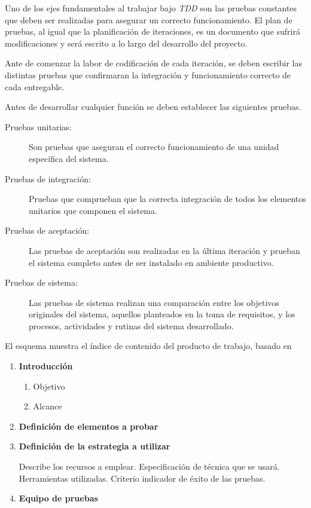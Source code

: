Uno de los ejes fundamentales al trabajar bajo \emph{TDD} son las pruebas constantes que deben ser realizadas para asegurar un correcto funcionamiento. El plan de pruebas, al igual que la planificación de iteraciones, es un documento que sufrirá modificaciones y será escrito a lo largo del desarrollo del proyecto.

Ante de comenzar la labor de codificación de cada iteración, se deben escribir las distintas pruebas que confirmaran la integración y funcionamiento correcto de cada entregable. 

Antes de desarrollar cualquier función se deben establecer las siguientes pruebas. 

\begin{description}
	\item[Pruebas unitarias:]\hfill

	Son pruebas que aseguran el correcto funcionamiento de una unidad específica del sistema. 

	\item[Pruebas de integración:]\hfill

	Pruebas que comprueban que la correcta integración de todos los elementos unitarios que componen el sistema.

	\item[Pruebas de aceptación:]\hfill

	Las pruebas de aceptación son realizadas en la última iteración y prueban el sistema completo antes de ser instalado en ambiente productivo.

	\item[Pruebas de sistema:]\hfill

	Las pruebas de sistema realizan una comparación entre los objetivos originales del sistema, aquellos planteados en la toma de requisitos, y los procesos, actividades y rutinas del sistema desarrollado.
\end{description}

El esquema muestra el índice de contenido del producto de trabajo, basado en \citet{mem00}

\begin{framed}
     \begin{enumerate}
		\item \textbf{Introducción}
		\begin{enumerate}
			\item Objetivo
			\item Alcance 
		\end{enumerate}
		\item \textbf{Definición de elementos a probar}	
		\item \textbf{Definición de la estrategia a utilizar}

		Describe los recursos a emplear. Especificación de técnica que se usará. Herramientas utilizadas. Criterio indicador de éxito de las pruebas.
		\item \textbf{Equipo de pruebas}
	\end{enumerate}
\end{framed}

